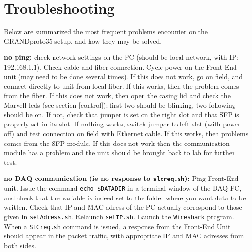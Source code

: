 \section{Troubleshooting}
Below are summarized the most frequent problems encounter on the GRANDproto35 setup, and how they may be solved.

\begin{enumerate}[$\bullet$]
{\item {\bf no ping:} check network settings on the PC (should be local network, with IP: 192.168.1.1). Check cable and fiber connection. Cycle power on the Front-End unit (may need to be done several times). If this does not work, go on field, and connect directly to unit from local fiber. If this works, then the problem comes from the fiber. If this does not work, then open the casing lid and check the Marvell leds (see section \ref{control}): first two should be blinking, two following should be on. If not, check that jumper is set on the right slot and that SFP is properly set in its slot. If nothing works, switch jumper to left slot (with power off) and test connection on field with Ethernet cable. If this works, then problems comes from the SFP module. If this does not work then the communication module has a problem and the unit should be brought back to lab for further test.}
{\item {\bf no DAQ communication (ie no response to \texttt{slcreq.sh}):} Ping Front-End unit. Issue the command \texttt{echo \$DATADIR} in a terminal window of the DAQ PC, and check that the variable is indeed set to the folder where you want data to be written. Check that IP and MAC adress of the PC actually correspond to those given in \texttt{setAdress.sh}. Relaunch \texttt{setIP.sh}. Launch the \texttt{Wireshark} program. When a \texttt{SLCreq.sh} command is issued, a response from the Front-End Unit should appear in the packet traffic, with appropriate IP and MAC adresses from both sides.}
\end{enumerate}
